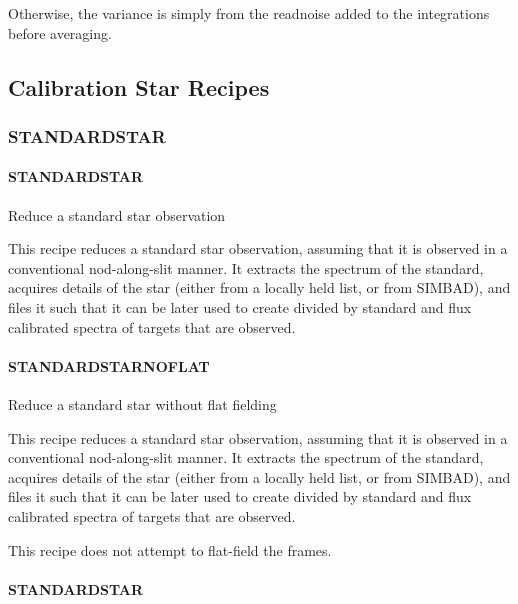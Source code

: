\documentclass[twoside,11pt]{article}
\renewcommand{\_}{\texttt{\symbol{95}}}
\begin{document}
Otherwise, the variance is simply from the readnoise added to the integrations
before averaging.



\subsection{Calibration Star Recipes}

\subsubsection{STANDARD\_STAR}
\paragraph{STANDARD\_STAR\label{STANDARD_STAR}}


Reduce a standard star observation


\mbox{}


This recipe reduces a standard star observation, assuming that it is
observed in a conventional nod-along-slit manner. It extracts the
spectrum of the standard, acquires details of the star (either from a
locally held list, or from SIMBAD), and files it such that it can be
later used to create divided by standard and flux calibrated spectra
of targets that are observed.

\paragraph{STANDARD\_STAR\_NOFLAT\label{STANDARD_STAR_NOFLAT}}


Reduce a standard star without flat fielding


\mbox{}


This recipe reduces a standard star observation, assuming that it is
observed in a conventional nod-along-slit manner. It extracts the
spectrum of the standard, acquires details of the star (either from a
locally held list, or from SIMBAD), and files it such that it can be
later used to create divided by standard and flux calibrated spectra
of targets that are observed.



This recipe does not attempt to flat-field the frames.

\paragraph{\_STANDARD\_STAR\_\label{_STANDARD_STAR_}}
\end{document}
